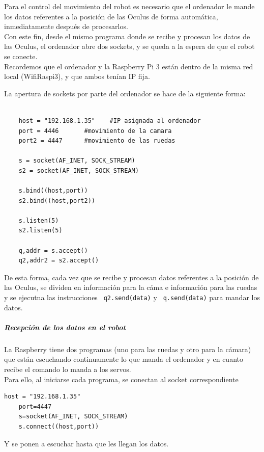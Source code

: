 \documentclass[twoside, 11pt]{epstfg}
\begin{document}
Para el control del movimiento del robot es necesario que el ordenador le mande los datos referentes a la posición de las Oculus de forma automática, inmediatamente después de procesarlos.\\
Con este fin, desde el mismo programa donde se recibe y procesan los datos de las Oculus, el ordenador abre dos sockets, y se queda a la espera de que el robot se conecte.\\
Recordemos que el ordenador y la Raspberry Pi 3 están dentro de la misma red local (WifiRaspi3), y que ambos tenían IP fija.

La apertura de sockets por parte del ordenador se hace de la siguiente forma:

\lstset{language=python, breaklines=true, basicstyle=\footnotesize}
\begin{lstlisting}[frame=single]

	host = "192.168.1.35"    #IP asignada al ordenador
	port = 4446       #movimiento de la camara
	port2 = 4447      #movimiento de las ruedas

	s = socket(AF_INET, SOCK_STREAM)
	s2 = socket(AF_INET, SOCK_STREAM)

	s.bind((host,port))
	s2.bind((host,port2))

	s.listen(5)
	s2.listen(5)

	q,addr = s.accept()
	q2,addr2 = s2.accept()

\end{lstlisting}

De esta forma, cada vez que se recibe y procesan datos referentes a la posición de las Oculus, se dividen en información para la cáma e información para las ruedas y se ejecutna las instrucciones \texttt{ q2.send(data)}  y \texttt{ q.send(data)} para mandar los datos.
\subparagraph{Recepción de los datos en el robot}

La Raspberry tiene dos programas (uno para las ruedas y otro para la
cámara) que están escuchando continuamente lo que manda el ordenador y en
cuanto recibe el comando lo manda a los servos.\\
Para ello, al iniciarse cada programa, se conectan al socket correspondiente
\lstset{language=python, breaklines=true, basicstyle=\footnotesize}
\begin{lstlisting}[frame=single]
	host = "192.168.1.35"
	port=4447
	s=socket(AF_INET, SOCK_STREAM)
	s.connect((host,port))
\end{lstlisting}

Y se ponen a escuchar hasta que les llegan los datos.
\end{document}
